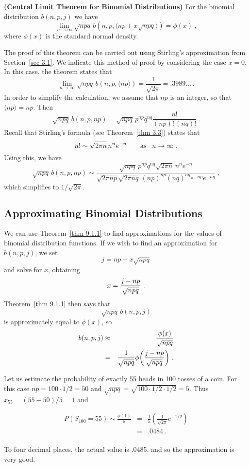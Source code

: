 \begin{theorem}{\bf (Central Limit Theorem for Binomial Distributions)}\label{thm
9.1.1}
For the binomial distribution $b(n,p,j)$ we have
$$
\lim_{n \to \infty} \sqrt{npq}\,b(n,p,\langle np + x\sqrt{npq} \rangle) = \phi(x)\ ,
$$
where $\phi(x)$ is the standard normal density.
\par
The proof of this theorem can be carried out using Stirling's approximation from
Section~\ref{sec 3.1}.  We indicate this method of proof by considering the
case $x = 0$.  In this case, the theorem states that
$$
\lim_{n \to \infty} \sqrt{npq}\,b(n,p,\langle np \rangle) = \frac 1{\sqrt{2\pi}}
= .3989\ldots\ .
$$
In order to simplify the calculation, we assume that $np$ is an integer, so
that $\langle np \rangle = np$.  Then
$$
\sqrt{npq}\,b(n,p,np) = \sqrt{npq}\,p^{np}q^{nq} \frac {n!}{(np)!\,(nq)!}\ .
$$
Recall that Stirling's formula (see Theorem~\ref{thm 3.3}) states that
$$
n! \sim \sqrt{2\pi n}\,n^n e^{-n} \qquad \mbox {as \,\,\,} n \to \infty\ .
$$
Using this, we have
$$
\sqrt{npq}\,b(n,p,np) \sim \frac {\sqrt{npq}\,p^{np}q^{nq} \sqrt{2\pi n}\,n^n
e^{-n}}{\sqrt{2\pi np} \sqrt{2\pi nq}\,(np)^{np} (nq)^{nq} e^{-np} e^{-nq}}\ ,
$$
which simplifies to $1/\sqrt{2\pi}$.
\end{theorem}
\subsection*{Approximating Binomial Distributions}
We can use Theorem~\ref{thm 9.1.1} to find approximations for the values of binomial
distribution functions.  If we wish to find an approximation for $b(n, p, j)$, we set
$$j = np + x\sqrt{npq}$$
and solve for $x$, obtaining
$$x = {{j-np}\over{\sqrt{npq}}}\ .$$
Theorem~\ref{thm 9.1.1} then says that 
$$\sqrt{npq}\,b(n,p,j)$$
is approximately equal to $\phi(x)$, so
\begin{eqnarray*}
b(n,p,j) &\approx& {{\phi(x)}\over{\sqrt{npq}}}\\
&=& {1\over{\sqrt{npq}}} \phi\biggl({{j-np}\over{\sqrt{npq}}}\biggr)\ .\\
\end{eqnarray*}


\begin{example}\label{exam 9.1}
Let us estimate the probability of exactly 55 heads in 100 tosses of a coin. 
For this case $np = 100 \cdot 1/2 = 50$ and $\sqrt{npq} = \sqrt{100 \cdot 1/2
\cdot 1/2} = 5$.  Thus $x_{55} = (55 - 50)/5 = 1$ and

\begin{eqnarray*}
P(S_{100} = 55) \sim \frac {\phi(1)}5 &=& \frac 15 \left( \frac 1{\sqrt{2\pi}}e^{-1/2} \right) \\
                                   &=& .0484\ . \\
\end{eqnarray*}

To four decimal places, the actual value is .0485, and so the
approximation is very good.
\end{example}


